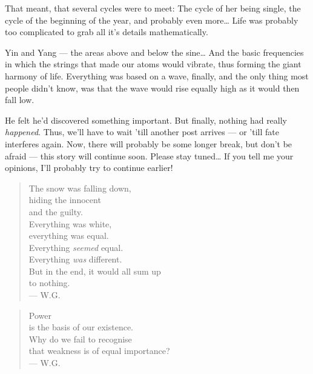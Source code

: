 That meant, that several cycles were to meet: The cycle of her being single, the cycle of the beginning of the year, and probably even more\dots{}
Life was probably too complicated to grab all it's details mathematically.

Yin and Yang --- the areas above and below the sine\dots{}
And the basic frequencies in which the strings that made our atoms would vibrate, thus forming the giant harmony of life. 
Everything was based on a wave, finally, and the only thing most people didn't know, was that the wave would rise equally high as it would then fall low.

He felt he'd discovered something important. 
But finally, nothing had really \emph{happened}. 
Thus, we'll have to wait 'till another post arrives --- or 'till fate interferes again. 
Now, there will probably be some longer break, but don't be afraid --- this story will continue soon. 
Please stay tuned\dots{}
If you tell me your opinions, I'll probably try to continue earlier!

\begin{quote}
The snow was falling down, \\
hiding the innocent \\
and the guilty. \\
Everything was white, \\
everything was equal. \\
Everything \emph{seemed} equal. \\
Everything \emph{was} different. \\
But in the end, it would all sum up \\
to nothing. \\
--- W.G.
\end{quote}

\begin{quote}
Power \\
is the basis of our existence. \\
Why do we fail to recognise \\
that weakness is of equal importance? \\
--- W.G.
\end{quote}
